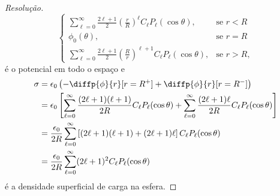 \begin{proof}[Resolução]
\begin{equation*}
\begin{cases}
            \sum_{\ell = 0}^\infty \frac{2\ell + 1}{2}\left(\frac{r}{R}\right)^\ell C_\ell P_\ell(\cos\theta), &\text{se } r < R\\
            \phi_0(\theta), &\text{se } r = R\\
            \sum_{\ell = 0}^\infty \frac{2\ell + 1}{2}\left(\frac{R}{r}\right)^{\ell + 1}C_\ell P_\ell(\cos\theta), &\text{se } r > R,
        \end{cases}
    \end{equation*}
    é o potencial em todo o espaço e
    \begin{align*}
        \sigma &= \epsilon_0 \left(- \diffp{\phi}{r}[r=R^+] + \diffp{\phi}{r}[r = R^-]\right)\\
               &= \epsilon_0 \left[\sum_{\ell = 0}^\infty \frac{(2\ell + 1)(\ell + 1)}{2R}C_\ell P_\ell(\cos\theta) + \sum_{\ell = 0}^\infty \frac{(2\ell + 1)\ell}{2R} C_\ell P_\ell(\cos\theta)\right]\\
               &= \frac{\epsilon_0}{2R}\sum_{\ell = 0}^\infty \left[(2\ell + 1)(\ell + 1) + (2\ell + 1)\ell\right]C_\ell P_\ell(\cos\theta)\\
               &= \frac{\epsilon_0}{2R}\sum_{\ell = 0}^\infty (2\ell + 1)^2C_\ell P_\ell(\cos\theta)
    \end{align*}
    é a densidade superficial de carga na esfera.
\end{proof}
